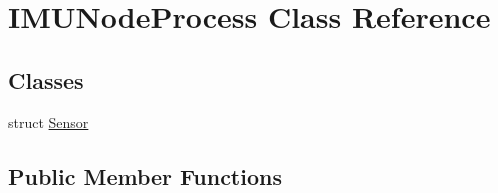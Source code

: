 \hypertarget{classIMUNodeProcess}{}\section{I\+M\+U\+Node\+Process Class Reference}
\label{classIMUNodeProcess}
\subsection*{Classes}
\begin{DoxyCompactItemize}
\item 
struct \hyperlink{structIMUNodeProcess_1_1Sensor}{Sensor}
\end{DoxyCompactItemize}
\subsection*{Public Member Functions}
